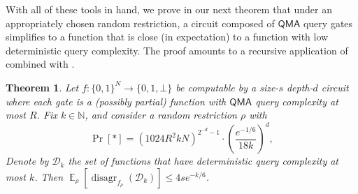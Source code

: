 \documentclass[10pt,a4paper]{article}
\newtheorem{theorem}{Theorem}
\newcommand{\E}{\mathop{\mathbb{E}}}
\newcommand{\Naturals}{\mathbb{N}}
\DeclareMathOperator{\disagr}{\mathrm{disagr}}
\begin{document}
With all of these tools in hand, we prove in our next theorem that under an appropriately chosen random restriction, a circuit composed of $\mathsf{QMA}$ query gates simplifies to a function that is close (in expectation) to a function with low deterministic query complexity. The proof amounts to a recursive application of  combined with .

\begin{theorem}
\label{thm:qmah_random_restriction}
Let $f: \{0,1\}^N \to \{0,1,\bot\}$ be computable by a size-$s$ depth-$d$ circuit where each gate is a (possibly partial) function with $\mathsf{QMA}$ query complexity at most $R$. Fix $k \in \Naturals$, and consider a random restriction $\rho$ with
\[
\Pr[*] = \left(1024R^2 k N\right)^{2^{-d} - 1} \cdot \left(\frac{e^{-1/6}}{18k}\right)^d,
\]
Denote by $\mathcal{D}_k$ the set of functions that have deterministic query complexity at most $k$. Then $\E_\rho\left[\disagr_{f_\rho}\left(\mathcal{D}_k\right)\right] \le 4se^{-k/6}$.
\end{theorem}
\end{document}
